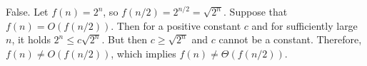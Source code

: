 False.
Let $f(n)=2^n$, so $f(n/2)=2^{n/2}=\sqrt{2^n}$.
Suppose that $f(n)=O(f(n/2))$.
Then for a positive constant $c$ and for sufficiently large $n$, it holds $2^n\le c\sqrt{2^n}$.
But then $c\ge\sqrt{2^n}$ and $c$ cannot be a constant.
Therefore, $f(n)\ne O(f(n/2))$, which implies $f(n)\ne\Theta(f(n/2))$.
